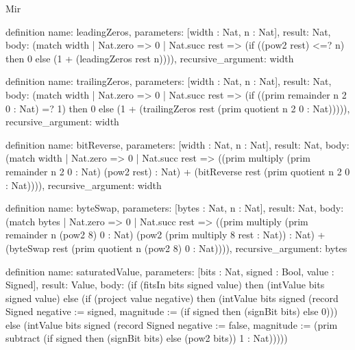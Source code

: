 \begin{lexlean}{Mir}
\begin{semanticmodule}
definition{
  name: leadingZeros,
  parameters: [width : Nat, n : Nat],
  result: Nat,
  body: (match width
    | Nat.zero => 0
    | Nat.succ rest => (if ((pow2 rest) <=? n) then 0 else (1 + (leadingZeros rest n)))),
  recursive_argument: width
}

definition{
  name: trailingZeros,
  parameters: [width : Nat, n : Nat],
  result: Nat,
  body: (match width
    | Nat.zero => 0
    | Nat.succ rest => (if ((prim remainder n 2 0 : Nat) =? 1) then 0 else (1 + (trailingZeros rest (prim quotient n 2 0 : Nat))))),
  recursive_argument: width
}

definition{
  name: bitReverse,
  parameters: [width : Nat, n : Nat],
  result: Nat,
  body: (match width
    | Nat.zero => 0
    | Nat.succ rest => ((prim multiply (prim remainder n 2 0 : Nat) (pow2 rest) : Nat) + (bitReverse rest (prim quotient n 2 0 : Nat)))),
  recursive_argument: width
}

definition{
  name: byteSwap,
  parameters: [bytes : Nat, n : Nat],
  result: Nat,
  body: (match bytes
    | Nat.zero => 0
    | Nat.succ rest => ((prim multiply (prim remainder n (pow2 8) 0 : Nat) (pow2 (prim multiply 8 rest : Nat)) : Nat) + (byteSwap rest (prim quotient n (pow2 8) 0 : Nat)))),
  recursive_argument: bytes
}

definition{
  name: saturatedValue,
  parameters: [bits : Nat, signed : Bool, value : Signed],
  result: Value,
  body: (if (fitsIn bits signed value) then (intValue bits signed value) else (if (project value negative) then (intValue bits signed (record Signed {negative := signed, magnitude := (if signed then (signBit bits) else 0)})) else (intValue bits signed (record Signed {negative := false, magnitude := (prim subtract (if signed then (signBit bits) else (pow2 bits)) 1 : Nat)}))))
}


\end{semanticmodule}
\end{lexlean}
